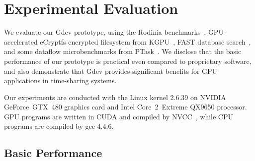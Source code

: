 \vspace{-0.25em}
\section{Experimental Evaluation}
\label{sec:evaluation}
\vspace{-0.25em}

We evaluate our Gdev prototype, using the Rodinia
benchmarks~\cite{Che_IISWC09}, GPU-accelerated eCryptfs encrypted
filesystem from KGPU~\cite{Sun_SECURITY11_Poster}, FAST database
search~\cite{Kim_SIGMOD10}, and some dataflow
microbenchmarks from PTask~\cite{Rossbach_SOSP11}.
We disclose that the basic performance of our prototype is practical
even compared to proprietary software, and also demonstrate that Gdev
provides significant benefits for GPU applications in time-sharing
systems.

Our experiments are conducted with the Linux kernel 2.6.39 on NVIDIA
GeForce~GTX~480 graphics card and Intel Core~2~Extreme QX9650 processor.
GPU programs are written in CUDA and compiled by NVCC~\cite{CUDA40},
while CPU programs are compiled by gcc 4.4.6.

\vspace{-0.25em}
\subsection{Basic Performance}
\vspace{-0.25em}

